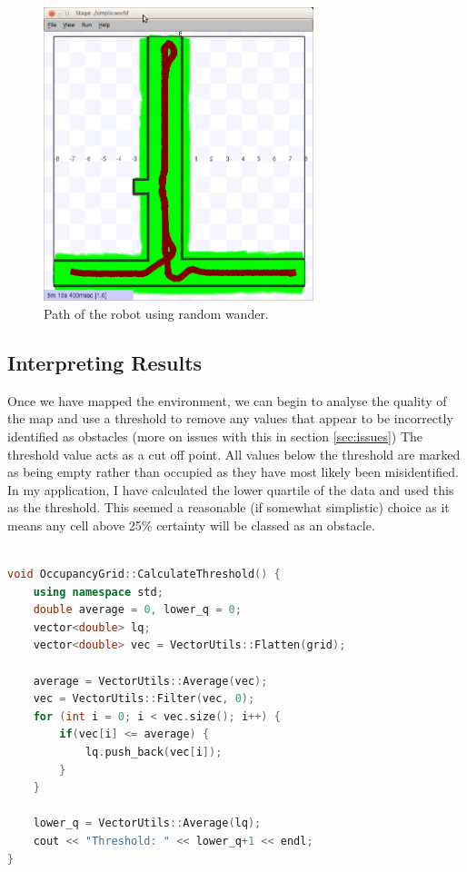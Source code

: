 \documentclass{article}
\begin{document}
\begin{figure}[H]
\centering
\includegraphics[width=0.7\textwidth]{sim_run.png}
\caption{Path of the robot using random wander.}
\label{fig:example-run}
\end{figure}

\subsection{Interpreting Results}
Once we have mapped the environment, we can begin to analyse the quality of the map and use a threshold to remove any values that appear to be incorrectly identified as obstacles (more on issues with this in section \ref{sec:issues}) The threshold value acts as a cut off point. All values below the threshold are marked as being empty rather than occupied as they have most likely been misidentified. In my application, I have calculated the lower quartile of the data and used this as the threshold. This seemed a reasonable (if somewhat simplistic) choice as it means any cell above 25\% certainty will be classed as an obstacle. 

\begin{center}
	\begin{lstlisting}[language=c++, showstringspaces=false, caption={C++ code used to calculate the threshold value for the grid}]

void OccupancyGrid::CalculateThreshold() {
	using namespace std;
	double average = 0, lower_q = 0;
	vector<double> lq;
	vector<double> vec = VectorUtils::Flatten(grid);
	
	average = VectorUtils::Average(vec);
	vec = VectorUtils::Filter(vec, 0);
	for (int i = 0; i < vec.size(); i++) {
		if(vec[i] <= average) {
			lq.push_back(vec[i]);
		}
	}

	lower_q = VectorUtils::Average(lq);
	cout << "Threshold: " << lower_q+1 << endl;
}

	\end{lstlisting}
\end{center}
\end{document}

